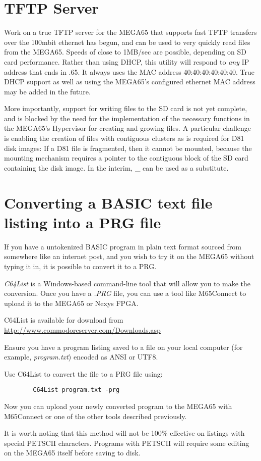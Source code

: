 \section{TFTP Server}

Work on a true TFTP server for the MEGA65 that supports fast
TFTP transfers over the 100mbit ethernet has begun, and can be used to
very quickly read files from the MEGA65. Speeds of close to 1MB/sec
are possible, depending on SD card performance.  Rather than using
DHCP, this utility will respond to {\em any} IP address that ends in
.65. It always uses the MAC address 40:40:40:40:40:40. True DHCP
support as well as using the MEGA65's configured ethernet MAC address
may be added in the future. 

More importantly, support for writing
files to the SD card is not yet complete, and is blocked by the need
for the implementation of the necessary functions in the MEGA65's Hypervisor for creating and
growing files.  A particular challenge is enabling the creation of
files with contiguous clusters as is required for D81 disk images: If
a D81 file is fragmented, then it cannot be mounted, because the
mounting mechanism requires a pointer to the contiguous block of the
SD card containing the disk image.
In the interim, \_ can be used as a substitute.

\section{Converting a BASIC text file listing into a PRG file}

If you have a untokenized BASIC program in plain text format sourced from somewhere like an internet post, and you wish to try it on the MEGA65 without typing it in, it is possible to convert it to a PRG.

\textit{C64List} is a Windows-based command-line tool that will allow you to make the conversion. Once you have a \textit{.PRG} file, you can use a tool like M65Connect to upload it to the MEGA65 or Nexys FPGA. 

C64List is available for download from \url{http://www.commodoreserver.com/Downloads.asp}

Ensure you have a program listing saved to a file on your local computer (for example, \textit{program.txt}) encoded as ANSI or UTF8.

Use C64List to convert the file to a PRG file using:
    
\begin{tcolorbox}[colback=black,coltext=white]
    \begin{verbatim}
        C64List program.txt -prg
    \end{verbatim}
\end{tcolorbox}

Now you can upload your newly converted program to the MEGA65 with M65Connect or one of the other tools described previously.

It is worth noting that this method will not be 100\% effective on listings with special PETSCII characters. Programs with PETSCII will require some editing on the MEGA65 itself before saving to disk.
